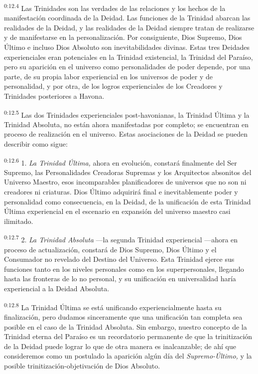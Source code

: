 \par
\textsuperscript{0:12.4} Las Trinidades son las verdades de las relaciones y los hechos de la manifestación coordinada de la Deidad. Las funciones de la Trinidad abarcan las realidades de la Deidad, y las realidades de la Deidad siempre tratan de realizarse y de manifestarse en la personalización. Por consiguiente, Dios Supremo, Dios Último e incluso Dios Absoluto son inevitabilidades divinas. Estas tres Deidades experienciales eran potenciales en la Trinidad existencial, la Trinidad del Paraíso, pero su aparición en el universo como personalidades de poder depende, por una parte, de su propia labor experiencial en los universos de poder y de personalidad, y por otra, de los logros experienciales de los Creadores y Trinidades posteriores a Havona.

\par
\textsuperscript{0:12.5} Las dos Trinidades experienciales post-havonianas, la Trinidad
Última y la Trinidad Absoluta, no están ahora manifestadas por completo; se encuentran en proceso de realización en el universo. Estas asociaciones de la Deidad se pueden describir como sigue:

\par
\textsuperscript{0:12.6} 1. \textit{La Trinidad Última,} ahora en evolución, constará finalmente del Ser Supremo, las Personalidades Creadoras Supremas y los Arquitectos absonitos del Universo Maestro, esos incomparables planificadores de universos que no son ni creadores ni criaturas. Dios Último adquirirá final e inevitablemente poder y personalidad como consecuencia, en la Deidad, de la unificación de esta Trinidad
Última experiencial en el escenario en expansión del universo maestro casi ilimitado.

\par
\textsuperscript{0:12.7} 2. \textit{La Trinidad Absoluta} ---la segunda Trinidad experiencial ---ahora en proceso de actualización, constará de Dios Supremo, Dios Último y el Consumador no revelado del Destino del Universo. Esta Trinidad ejerce sus funciones tanto en los niveles personales como en los superpersonales, llegando hasta las fronteras de lo no personal, y su unificación en universalidad haría experiencial a la Deidad Absoluta.

\par
\textsuperscript{0:12.8} La Trinidad Última se está unificando experiencialmente hasta su finalización, pero dudamos sinceramente que una unificación tan completa sea posible en el caso de la Trinidad Absoluta. Sin embargo, nuestro concepto de la Trinidad eterna del Paraíso es un recordatorio permanente de que la trinitización de la Deidad puede lograr lo que de otra manera es inalcanzable; de ahí que consideremos como un postulado la aparición algún día del \textit{Supremo-Último,} y la posible trinitización-objetivación de Dios Absoluto.

